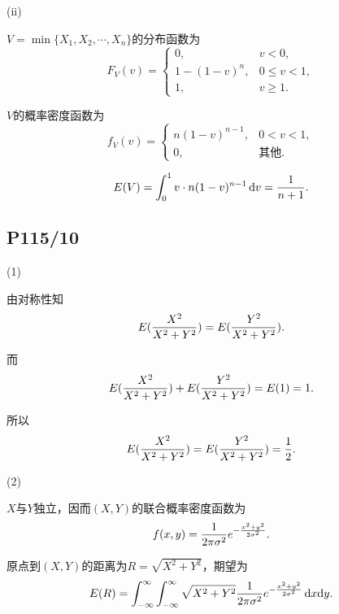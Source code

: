 \documentclass[UTF8,a4paper,10pt]{ctexart}
\begin{document}
(ii)


$V=\min\{X_1,X_2,\cdots,X_n\}$的分布函数为
\begin{equation}
    F_V(v)= \left\{
    \begin{array}{lr}
    0,& v<0, \\
    1-(1-v)^n, & 0\leq v<1, \\
    1, & v\geq1 . 
    \end{array}
    \right.
\end{equation}

$V$的概率密度函数为
\begin{equation}
    f_V(v)= \left\{
    \begin{array}{lr}
        n(1-v)^{n-1}, & 0<v<1, \\
        0, & \text{其他}.
    \end{array}
    \right.
\end{equation}

\begin{equation}
    E(V) = \int_0^1 v \cdot n(1-v)^{n-1}\,\text{d}v = {1\over n+1}.
\end{equation}

\subsection{P115/10}
\noindent(1)

由对称性知
\begin{equation}
    E({X^2\over X^2+Y^2}) = E({Y^2\over X^2+Y^2}).
\end{equation}

而
\begin{equation}
    E({X^2\over X^2+Y^2}) + E({Y^2\over X^2+Y^2}) = E(1) = 1.
\end{equation}

所以
\begin{equation}
    E({X^2\over X^2+Y^2}) = E({Y^2\over X^2+Y^2}) = {1\over2}.
\end{equation}

\noindent(2)

$X$与$Y$独立，因而$(X,Y)$的联合概率密度函数为
\begin{equation}
    f(x,y) = {1\over 2\pi\sigma^2}e^{-{x^2+y^2\over 2\sigma^2}} .
\end{equation}

原点到$(X,Y)$的距离为$R = \sqrt{X^2+Y^2}$，期望为
\begin{equation}
    E(R) = \int_{-\infty}^\infty\int_{-\infty}^\infty \sqrt{X^2+Y^2} {1\over 2\pi\sigma^2}e^{-{x^2+y^2\over 2\sigma^2}} \, \text{d}x\text{d}y.
\end{equation}
\end{document}
